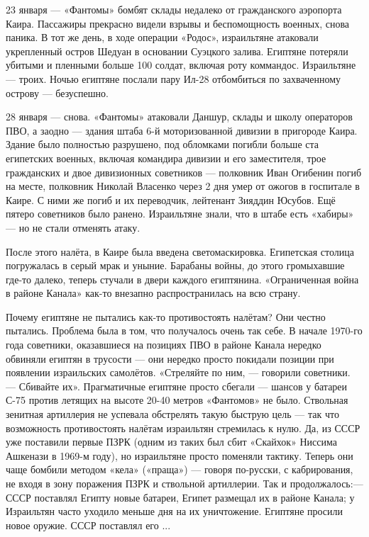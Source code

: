 23 января — «Фантомы» бомбят склады недалеко от гражданского аэропорта Каира. Пассажиры прекрасно видели взрывы и беспомощность военных, снова паника. В тот же день, в ходе операции «Родос», израильтяне атаковали укрепленный остров Шедуан в основании Суэцкого залива. Египтяне потеряли убитыми и пленными больше 100 солдат, включая роту коммандос. Израильтяне — троих. Ночью египтяне послали пару Ил-28 отбомбиться по захваченному острову — безуспешно.

28 января — снова. «Фантомы» атаковали Даншур, склады и школу операторов ПВО, а заодно — здания штаба 6-й моторизованной дивизии в пригороде Каира. Здание было полностью разрушено, под обломками погибли больше ста египетских военных, включая командира дивизии и его заместителя, трое гражданских и двое дивизионных советников — полковник Иван Огибенин погиб на месте, полковник Николай Власенко через 2 дня умер от ожогов в госпитале в Каире. С ними же погиб и их переводчик, лейтенант Зияддин Юсубов. Ещё пятеро советников было ранено. Израильтяне знали, что в штабе есть «хабиры» — но не стали отменять атаку.

После этого налёта, в Каире была введена светомаскировка. Египетская столица погружалась в серый мрак и уныние. Барабаны войны, до этого громыхавшие где-то далеко, теперь стучали в двери каждого египтянина. «Ограниченная война в районе Канала» как-то внезапно распространилась на всю страну.

Почему египтяне не пытались как-то противостоять налётам? Они честно пытались. Проблема была в том, что получалось очень так себе. В начале 1970-го года советники, оказавшиеся на позициях ПВО в районе Канала нередко обвиняли египтян в трусости — они нередко просто покидали позиции при появлении израильских самолётов. «Стреляйте по ним, — говорили советники. — Сбивайте их». Прагматичные египтяне просто сбегали — шансов у батареи С-75 против летящих на высоте 20-40 метров «Фантомов» не было. Ствольная зенитная артиллерия не успевала обстрелять такую быструю цель — так что возможность противостоять налётам израильтян стремилась к нулю. Да, из СССР уже поставили первые ПЗРК (одним из таких был сбит «Скайхок» Ниссима Ашкенази в 1969-м году), но израильтяне просто поменяли тактику. Теперь они чаще бомбили методом «кела» («праща») — говоря по-русски, с кабрирования, не входя в зону поражения ПЗРК и ствольной артиллерии. Так и продолжалось:— СССР поставлял Египту новые батареи, Египет размещал их в районе Канала; у Израильтян часто уходило меньше дня на их уничтожение. Египтяне просили новое оружие. СССР поставлял его ...

